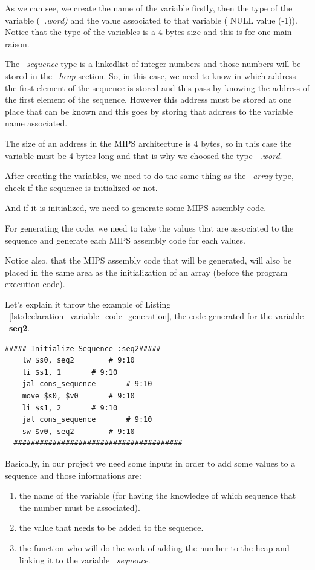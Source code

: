 \documentclass[
  oneside,
  11pt, a4paper,
  footinclude=true,
  headinclude=true,
  cleardoublepage=empty
]{scrbook}
\begin{document}
As we can see, we create the name of the variable firstly, then the type of the variable (~\textit{.word)} and the value associated to that variable ( NULL value (-1)). Notice that the type of the variables is a 4 bytes size and this is for one main raison.

The ~\textit{sequence} type is a linkedlist of integer numbers and those numbers will be stored in the ~\textit{heap} section.
So, in this case, we need to know in which address the first element of the sequence is stored and this pass by knowing the address of the first element of the sequence. However this address must be stored at one place that can be known and this goes by storing that address to the variable name associated.

The size of an address in the MIPS architecture is 4 bytes, so in this case the variable must be 4 bytes long and that is why we choosed the type ~\textit{.word}.

After creating the variables, we need to do the same thing as the ~\textit{array} type, check if the sequence is initialized or not.

And if it is initialized, we need to generate some MIPS assembly code. 

For generating the code, we need to take the values that are associated to the sequence and generate each MIPS assembly code for each values.

Notice also, that the MIPS assembly code that will be generated, will also be placed in the same area as the initialization of an array (before the program execution code).

Let's explain it throw the example of Listing ~\ref{lst:declaration_variable_code_generation}, the code generated for the variable ~\textbf{seq2}.

\begin{lstlisting}[caption={Code generated for the sequence variable},label={lst:sequence_initialization_mips}]
  ##### Initialize Sequence :seq2#####
	lw $s0, seq2		# 9:10
	li $s1, 1		# 9:10
	jal cons_sequence		# 9:10
	move $s0, $v0		# 9:10
	li $s1, 2		# 9:10
	jal cons_sequence		# 9:10
	sw $v0, seq2		# 9:10
  #######################################
\end{lstlisting}

Basically, in our project we need some  inputs in order to add some values to a sequence and those informations are:
\begin{enumerate}
\item the name of the variable (for having the knowledge of which sequence that the number must be associated).
\item the value that needs to be added to the sequence.
\item the function who will do the work of adding the number to the heap and linking it to the variable ~\textit{sequence}.
\end{enumerate}
\end{document}
